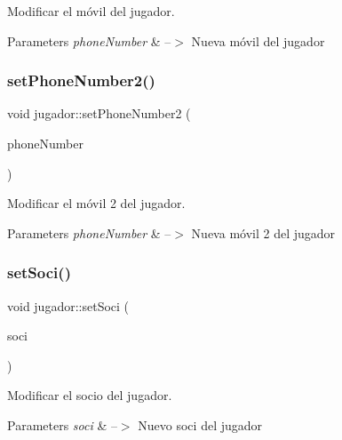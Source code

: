 Modificar el móvil del jugador. 


\begin{DoxyParams}{Parameters}
{\em phone\+Number} & --$>$ Nueva móvil del jugador \\
\hline
\end{DoxyParams}
\mbox{\label{classjugador_a7541a8d0d7df4c5cc1fc49b15cd24da3}} 
\subsubsection{\texorpdfstring{set\+Phone\+Number2()}{setPhoneNumber2()}}
{\footnotesize\ttfamily void jugador\+::set\+Phone\+Number2 (\begin{DoxyParamCaption}\item[{Q\+String}]{phone\+Number }\end{DoxyParamCaption})}



Modificar el móvil 2 del jugador. 


\begin{DoxyParams}{Parameters}
{\em phone\+Number} & --$>$ Nueva móvil 2 del jugador \\
\hline
\end{DoxyParams}
\mbox{\label{classjugador_a684e5c98a3c39214b93923615d1a2fb2}} 
\subsubsection{\texorpdfstring{set\+Soci()}{setSoci()}}
{\footnotesize\ttfamily void jugador\+::set\+Soci (\begin{DoxyParamCaption}\item[{Q\+String}]{soci }\end{DoxyParamCaption})}



Modificar el socio del jugador. 


\begin{DoxyParams}{Parameters}
{\em soci} & --$>$ Nuevo soci del jugador \\
\hline
\end{DoxyParams}
\mbox{\label{classjugador_ae853f109166a05c832bb89f84cc7408c}} 
